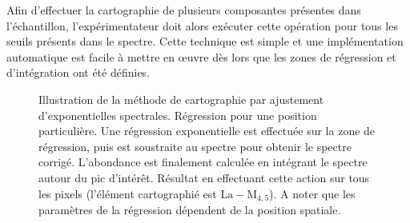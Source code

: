     Afin d'effectuer la cartographie de plusieurs composantes présentes dans l'échantillon, l'expérimentateur doit alors exécuter cette opération pour tous les seuils présents dans le spectre. Cette technique est simple et une implémentation automatique est facile à mettre en \oe{}uvre dès lors que les zones de régression et d'intégration ont été définies.
    
    \begin{figure}[t]
        \centering
        \hspace{1em}
        \caption{Illustration de la méthode de cartographie par ajustement d'exponentielles spectrales. \protect{} Régression pour une position particulière. Une régression exponentielle est effectuée sur la zone de régression, puis est soustraite au spectre pour obtenir le spectre corrigé. L'abondance est finalement calculée en intégrant le spectre autour du pic d'intérêt. \protect{} Résultat en effectuant cette action sur tous les pixels (l'élément cartographié est $\mathrm{La-M}_{4, 5}$). A noter que les paramètres de la régression dépendent de la position spatiale.
            \protect\label{fig-carto-separation}}
    \end{figure}
    
